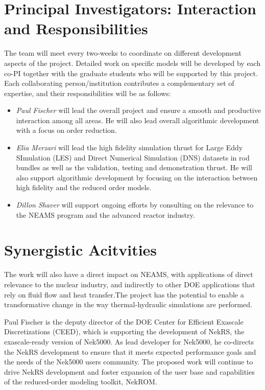 \section{Principal Investigators: Interaction and Responsibilities}

The team will meet every two-weeks to coordinate on different development
aspects of the project. Detailed work on specific models will be developed by
each co-PI together with the graduate students who will be supported by this
project. Each collaborating person/institution contributes a complementary set
of expertise, and their responsibilities will be as follows: 
\begin{itemize}
    \item \textit{Paul  Fischer} will  lead the overall project and ensure a
smooth and productive interaction among all areas. He will also lead overall
algorithmic development with a focus on order reduction.  

\item \textit{Elia Merzari} will lead the high fidelity simulation thrust
for Large Eddy SImulation (LES) and Direct Numerical Simulation (DNS) datasets
in rod bundles as well as the validation, testing and demonstration thrust. He
will also support algorithmic development by focusing on the interaction
between high fidelity and the reduced order models.  

\item \textit{Dillon
Shaver} will support ongoing efforts by consulting on
the relevance to the NEAMS program and the advanced reactor industry.
\end{itemize}
\section{Synergistic Acitvities}
The work will also have a direct impact on NEAMS, with applications of direct
relevance to the nuclear industry, and indirectly to other DOE applications
that rely on fluid flow and heat transfer.The project has the potential to
enable a transformative change in the way thermal-hydraulic simulations are
performed.

Paul Fischer is the deputy director of the DOE Center for Efficient Exascale
Discretizations (CEED), which is supporting the development of NekRS,
the exascale-ready version of Nek5000.  As lead developer for Nek5000, he
co-directs the NekRS development to ensure that it meets expected performance
goals and the needs of the Nek5000 users community.  The proposed work will
continue to drive NekRS development and foster expansion of the user base
and capabilities of the reduced-order modeling toolkit, NekROM.

